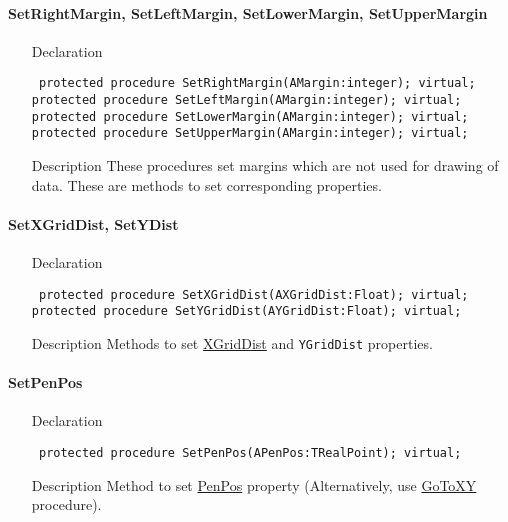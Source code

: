 \documentclass[12pt,a4paper,oneside]{report}
\newcommand{\declarationitem}[1]{{\addfontfeatures{FakeBold=1.3} #1}}
\newcommand{\descriptiontitle}[1]{{\addfontfeatures{FakeSlant}#1}}
\newcommand{\code}[1]{\texttt{#1}}
\begin{document}
\paragraph{SetRightMargin, SetLeftMargin, SetLowerMargin, SetUpperMargin}\hspace*{\fill}
\label{lmcoordsys.TCoordSys-SetRightMargin}
\label{lmcoordsys.TCoordSys-SetLowerMargin}
\label{lmcoordsys.TCoordSys-SetUpperMargin}
\label{lmcoordsys.TCoordSys-SetLeftMargin}
\begin{itemize}\item[\declarationitem{Declaration}\hfill]
	\begin{flushleft}
		\code{
			protected procedure SetRightMargin(AMargin:integer); virtual;\\
			protected procedure SetLeftMargin(AMargin:integer); virtual;\\
			protected procedure SetLowerMargin(AMargin:integer); virtual;\\
			protected procedure SetUpperMargin(AMargin:integer); virtual;}
	\end{flushleft}
	\item[\descriptiontitle{Description}] These procedures set margins which are not used for drawing of data. These are methods to set corresponding properties.
\end{itemize}

\paragraph{SetXGridDist, SetYDist}\hspace*{\fill}
\label{lmcoordsys.TCoordSys-SetXGridDist}
\begin{itemize}\item[\declarationitem{Declaration}\hfill]
	\begin{flushleft}
		\code{
			protected procedure SetXGridDist(AXGridDist:Float); virtual;\\
			protected procedure SetYGridDist(AYGridDist:Float); virtual;}
	\end{flushleft}
	\item[\descriptiontitle{Description}] Methods to set \hyperref[lmcoordsys.TCoordSys-XGridDist]{XGridDist} and \code{YGridDist} properties.
\end{itemize}
\paragraph{SetPenPos}\hspace*{\fill}
\label{lmcoordsys.TCoordSys-SetPenPos}
\begin{itemize}\item[\declarationitem{Declaration}\hfill]
	\begin{flushleft}
		\code{
			protected procedure SetPenPos(APenPos:TRealPoint); virtual;}
	\end{flushleft}
	\item[\descriptiontitle{Description}] Method to set \hyperref[lmcoordsys.TCoordSys-PenPos]{PenPos} property (Alternatively, use \hyperref[lmcoordsys.TCoordSys-GoToXY]{GoToXY} procedure).
\end{itemize}
\end{document}
